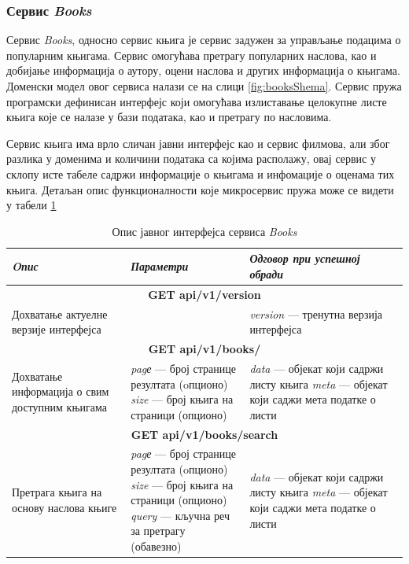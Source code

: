 \documentclass[12pt,oneside]{memoir}
\begin{document}
\newpage

\subsubsection{Сервис \textit{Books}}

Сервис \textit{Books}, односно сервис књига је сервис задужен за управљање подацима о популарним књигама. Сервис омогућава претрагу популарних наслова, као и добијање информација о аутору, оцени наслова и других информација о књигама. Доменски модел овог сервиса налази се на слици \ref{fig:booksShema}. 
Сервис пружа програмски дефинисан интерфејс који омогућава излиставање целокупне листе књига које се налазе у бази података, као и претрагу по насловима.
\newpage

Сервис књига има врло сличан јавни интерфејс као и сервис филмова, али због разлика у доменима и количини података са којима располажу, овај сервис у склопу исте табеле садржи информације о књигама и инфомације о оценама тих књига. Детаљан опис функционалности које микросервис пружа може се видети у табели \ref{tbl:booksAPI}


\begin{table}
\caption{Опис јавног интерфејса сервиса \textit{Books}}
\label{tbl:booksAPI}
\begin{tabular}{ |  p{0.3\linewidth} | p{0.3\linewidth}|  p{0.4\linewidth} | }
\hline
\textit{Oпис} & \textit{Параметри} & \textit{Одговор при успешној обради} \\
\hline
\multicolumn{3}{|c|}{\textbf{GET api/v1/version}} \\
\hline
Дохватање актуелне верзије интерфејса & & 
\textit{version} --- тренутна верзија интерфејса \\
\hline
\multicolumn{3}{|c|}{\textbf{GET api/v1/books/}} \\
\hline
Дохватање информација о свим доступним књигама & 
\textit{pagе} --- број странице резултата (oпционо) \newline 
\textit{size} --- број књига на страници (опционо)
& 
\textit{data} --- објекат који садржи листу књига \newline
\textit{meta} --- објекат који саджи мета податке о листи \\
\hline
\multicolumn{3}{|c|}{\textbf{GET api/v1/books/search}} \\
\hline
Претрага књига на основу наслова књиге &
\textit{pagе} --- број странице резултата (oпционо) \newline 
\textit{size} --- број књига на страници (опционо) \newline 
\textit{query} --- кључна реч за претрагу (обавезно) 
  & 
\textit{data} --- објекат који садржи листу књига \newline
\textit{meta} --- објекат који саджи мета податке о листи \\
\hline
\end{tabular}
\end{table}
\end{document}
